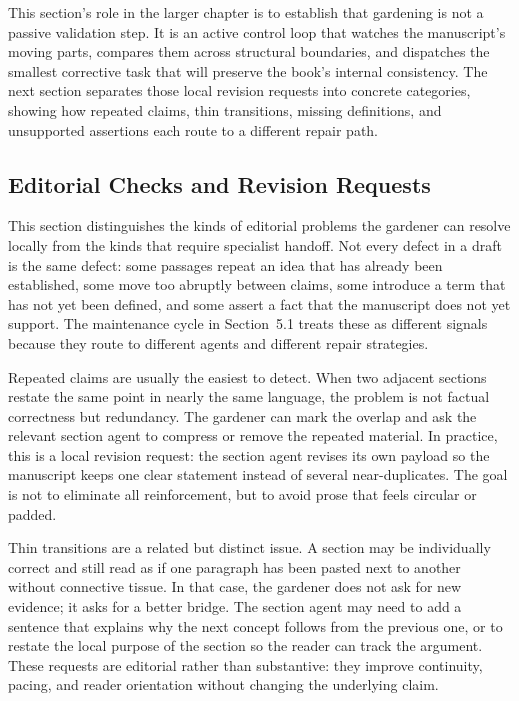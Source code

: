 \documentclass[11pt]{article}
\begin{document}
This section's role in the larger chapter is to establish that gardening is not a passive validation step. It is an active control loop that watches the manuscript's moving parts, compares them across structural boundaries, and dispatches the smallest corrective task that will preserve the book's internal consistency. The next section separates those local revision requests into concrete categories, showing how repeated claims, thin transitions, missing definitions, and unsupported assertions each route to a different repair path.



\subsection{Editorial Checks and Revision Requests}


This section distinguishes the kinds of editorial problems the gardener can resolve locally from the kinds that require specialist handoff. Not every defect in a draft is the same defect: some passages repeat an idea that has already been established, some move too abruptly between claims, some introduce a term that has not yet been defined, and some assert a fact that the manuscript does not yet support. The maintenance cycle in Section~5.1 treats these as different signals because they route to different agents and different repair strategies.

Repeated claims are usually the easiest to detect. When two adjacent sections restate the same point in nearly the same language, the problem is not factual correctness but redundancy. The gardener can mark the overlap and ask the relevant section agent to compress or remove the repeated material. In practice, this is a local revision request: the section agent revises its own payload so the manuscript keeps one clear statement instead of several near-duplicates. The goal is not to eliminate all reinforcement, but to avoid prose that feels circular or padded.

Thin transitions are a related but distinct issue. A section may be individually correct and still read as if one paragraph has been pasted next to another without connective tissue. In that case, the gardener does not ask for new evidence; it asks for a better bridge. The section agent may need to add a sentence that explains why the next concept follows from the previous one, or to restate the local purpose of the section so the reader can track the argument. These requests are editorial rather than substantive: they improve continuity, pacing, and reader orientation without changing the underlying claim.
\end{document}
